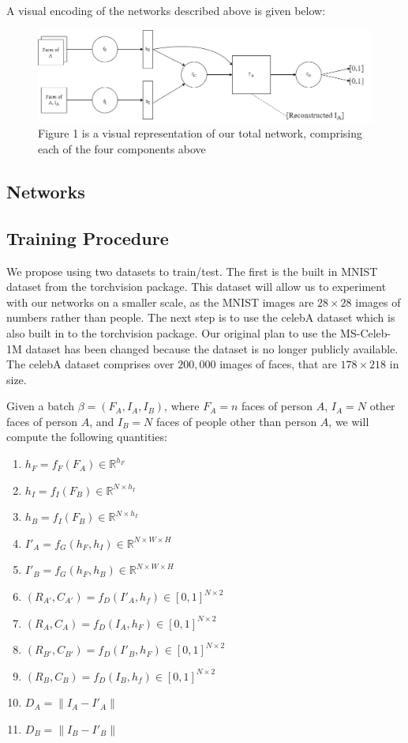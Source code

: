 \documentclass{article}
\begin{document}
A visual encoding of the networks described above is given below:
\begin{figure}[hbt]
    \centering
    \includegraphics[scale=0.25]{images/OurNetwork.png}
    \caption{Figure 1 is a visual representation of our total network, comprising each of the four components above}
    \label{fig:my_label}
\end{figure}

\subsection{Networks}

\subsection{Training Procedure}

We propose using two datasets to train/test. The first is the built in MNIST dataset from the torchvision package. This dataset will allow us to experiment with our networks on a smaller scale, as the MNIST images are $28 \times 28$ images of numbers rather than people. The next step is to use the celebA dataset which is also built in to the torchvision package. Our original plan to use the MS-Celeb-1M dataset \cite{guo2016ms} 
has been changed because the dataset is no longer publicly available. The celebA dataset comprises over $200,000$ images of faces, that are $178 \times 218$ in size.

Given a batch $\beta = (F_A, I_A, I_B)$, where $F_A = n$ faces of person $A$, $I_A = N$ other faces of person $A$, and $I_B = N $ faces of people other than person $A$, we will compute the following quantities:
\begin{enumerate}
    \item $h_F = f_F(F_A) \in \mathbb{R}^{h_F}$
    \item $h_I = f_I(F_B) \in \mathbb{R}^{N \times h_I}$
    \item $h_B = f_I(F_B) \in \mathbb{R}^{N \times h_I}$
    \item $I'_A = f_G(h_F, h_I) \in \mathbb{R}^{N \times W \times H}$
    \item $I'_B = f_G(h_F, h_B) \in \mathbb{R}^{N \times W \times H}$
    \item $(R_{A'}, C_{A'}) = f_D(I'_A, h_f) \in [0,1]^{N \times 2}$
    \item $(R_A, C_A) = f_D(I_A, h_F) \in [0,1]^{N \times 2}$
    \item $(R_{B'}, C_{B'}) = f_D(I'_B, h_F) \in [0,1]^{N \times 2}$
    \item $(R_B, C_B) = f_D(I_B, h_f) \in [0,1]^{N \times 2}$
    \item $D_A = \|I_A - I'_A\|$
    \item $D_B = \|I_B - I'_B\|$
\end{enumerate}
\end{document}
